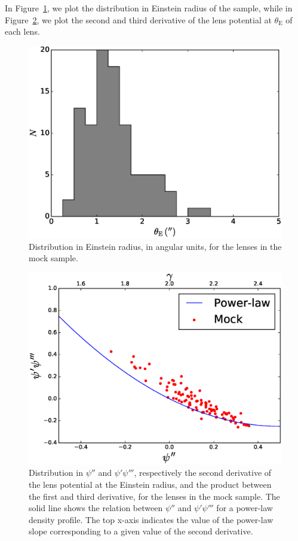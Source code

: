 \documentclass[usenatbib]{mnras}
\def\psii{\psi'}
\def\psiii{\psi''}
\def\psiiii{\psi'''}
\def\tein{\theta_{\mathrm{E}}}
\def\Fref#1{Figure~\ref{#1}\xspace}
\begin{document}
In \Fref{fig:rein}, we plot the distribution in Einstein radius of the sample, while in \Fref{fig:psi}, we plot the second and third derivative of the lens potential at $\tein$ of each lens.
%
\begin{figure}
 \includegraphics[width=\columnwidth]{rein_hist.eps}
 \caption{Distribution in Einstein radius, in angular units, for the lenses in the mock sample.}
 \label{fig:rein}
\end{figure}
%
%
\begin{figure}
 \includegraphics[width=\columnwidth]{psi_plot.eps}
 \caption{Distribution in $\psiii$ and $\psii\psiiii$, respectively the second derivative of the lens potential at the Einstein radius, and the product between the first and third derivative, for the lenses in the mock sample.
The solid line shows the relation between $\psiii$ and $\psii\psiiii$ for a power-law density profile. The top x-axis indicates the value of the power-law slope corresponding to a given value of the second derivative.
}
 \label{fig:psi}
\end{figure}
\end{document}
